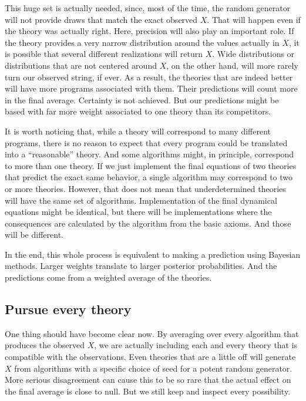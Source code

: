 \documentclass{article}
\begin{document}
	
	This huge set is actually needed, since, most of the time, the random generator will not provide draws that match the exact observed $X$. That will happen even if the theory was actually right. Here, precision will also play an important role. If the theory provides a very narrow distribution around the values actually in $X$, it is possible that several different realizations will return $X$. Wide distributions or distributions that are not centered around $X$, on the other hand, will more rarely turn our observed string, if ever. As a result, the theories that are indeed better will have more programs associated with them.  Their predictions will count more in the final average. Certainty is not achieved. But our predictions might be based with far more weight associated to one theory than its competitors. 
	
	
	
	It is worth noticing that, while a theory will correspond to many different programs, there is no reason to expect that every program could be translated into a ``reasonable'' theory.  And some algorithms might, in principle, correspond to more than one theory.  If we just implement the final equations of two theories that predict the exact same behavior, a single algorithm may correspond to two or more theories. However, that does not mean that underdetermined theories will have the same set of algorithms. Implementation of the final dynamical equations might be identical, but there will be implementations where the consequences are calculated by the algorithm from the basic axioms. And those will be different.
	
	In the end, this whole process is equivalent to making a prediction using Bayesian methods. Larger weights translate to larger posterior probabilities. And the predictions come from a weighted average of the theories.  
	
	
	
	
	
	\subsection{Pursue every theory}
	
	One thing should have become clear now. By averaging over every algorithm that produces the observed $X$, we are actually including each and every theory that is compatible with the observations. Even theories that are a little off will generate $X$ from algorithms with a specific choice of seed for a potent random generator. More serious disagreement can cause this to be so rare that the actual effect on the final average is close to null. But we still keep and inspect every possibility.
	
\end{document}
